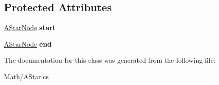 \subsection*{Protected Attributes}
\begin{DoxyCompactItemize}
\item 
\mbox{\label{class_stompy_blondie_1_1_math_1_1_a_star_aa83953b9f5eccd538d5a64c9cb4eb51f}} 
\mbox{\hyperlink{class_stompy_blondie_1_1_math_1_1_a_star_node}{A\+Star\+Node}} {\bfseries start}
\item 
\mbox{\label{class_stompy_blondie_1_1_math_1_1_a_star_ab1472040ee08ddfc6f2817198de0ea97}} 
\mbox{\hyperlink{class_stompy_blondie_1_1_math_1_1_a_star_node}{A\+Star\+Node}} {\bfseries end}
\end{DoxyCompactItemize}


The documentation for this class was generated from the following file\+:\begin{DoxyCompactItemize}
\item 
Math/A\+Star.\+cs\end{DoxyCompactItemize}
